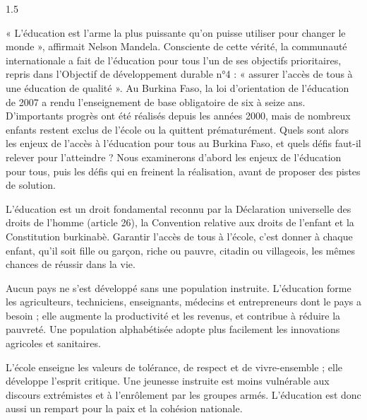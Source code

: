 \documentclass[12pt]{article}
\begin{document}
\begin{spacing}{1.5}


« L'éducation est l'arme la plus puissante qu'on puisse utiliser pour changer le monde », affirmait Nelson Mandela. Consciente de cette vérité, la communauté internationale a fait de l'éducation pour tous l'un de ses objectifs prioritaires, repris dans l'Objectif de développement durable n°4 : « assurer l'accès de tous à une éducation de qualité ». Au Burkina Faso, la loi d'orientation de l'éducation de 2007 a rendu l'enseignement de base obligatoire de six à seize ans. D'importants progrès ont été réalisés depuis les années 2000, mais de nombreux enfants restent exclus de l'école ou la quittent prématurément. Quels sont alors les enjeux de l'accès à l'éducation pour tous au Burkina Faso, et quels défis faut-il relever pour l'atteindre ? Nous examinerons d'abord les enjeux de l'éducation pour tous, puis les défis qui en freinent la réalisation, avant de proposer des pistes de solution.


L'éducation est un droit fondamental reconnu par la Déclaration universelle des droits de l'homme (article 26), la Convention relative aux droits de l'enfant et la Constitution burkinabè. Garantir l'accès de tous à l'école, c'est donner à chaque enfant, qu'il soit fille ou garçon, riche ou pauvre, citadin ou villageois, les mêmes chances de réussir dans la vie.

Aucun pays ne s'est développé sans une population instruite. L'éducation forme les agriculteurs, techniciens, enseignants, médecins et entrepreneurs dont le pays a besoin ; elle augmente la productivité et les revenus, et contribue à réduire la pauvreté. Une population alphabétisée adopte plus facilement les innovations agricoles et sanitaires.

L'école enseigne les valeurs de tolérance, de respect et de vivre-ensemble ; elle développe l'esprit critique. Une jeunesse instruite est moins vulnérable aux discours extrémistes et à l'enrôlement par les groupes armés. L'éducation est donc aussi un rempart pour la paix et la cohésion nationale.



\end{spacing}
\end{document}
